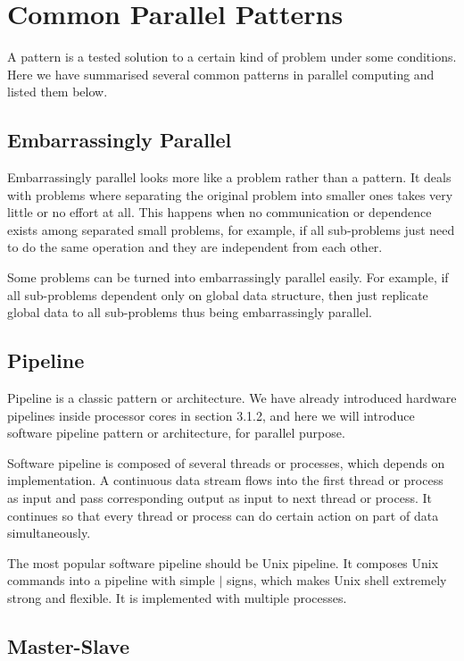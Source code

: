 \chapter{Common Parallel Patterns}

A pattern is a tested solution to a certain kind of problem under some conditions. Here we have summarised several common patterns in parallel computing and listed them below.

\section{Embarrassingly Parallel}

Embarrassingly parallel looks more like a problem rather than a pattern. It deals with problems where separating the original problem into smaller ones takes very little or no effort at all. This happens when no communication or dependence exists among separated small problems, for example, if all sub-problems just need to do the same operation and they are independent from each other.

Some problems can be turned into embarrassingly parallel easily. For example, if all sub-problems dependent only on global data structure, then just replicate global data to all sub-problems thus being embarrassingly parallel.

\section{Pipeline}

Pipeline is a classic pattern or architecture. We have already introduced hardware pipelines inside processor cores in section 3.1.2, and here we will introduce software pipeline pattern or architecture, for parallel purpose.

Software pipeline is composed of several threads or processes, which depends on implementation. A continuous data stream flows into the first thread or process as input and pass corresponding output as input to next thread or process. It continues so that every thread or process can do certain action on part of data simultaneously.

The most popular software pipeline should be Unix pipeline. It composes Unix commands into a pipeline with simple $\mid$ signs, which makes Unix shell extremely strong and flexible. It is implemented with multiple processes.

\section{Master-Slave}

